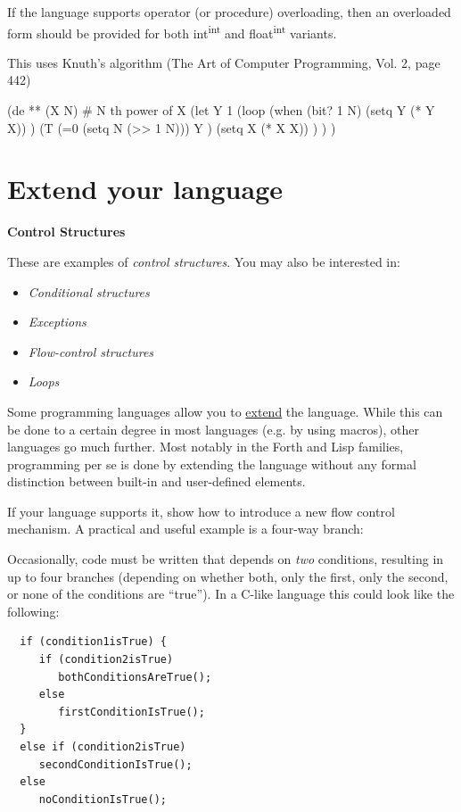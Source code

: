 If the language supports operator (or procedure) overloading, then an
overloaded form should be provided for both int\textsuperscript{int} and
float\textsuperscript{int} variants.


\begin{wideverbatim}

  This uses Knuth's algorithm (The Art of Computer Programming, Vol.
  2, page 442)

(de ** (X N)  # N th power of X
   (let Y 1
      (loop
         (when (bit? 1 N)
            (setq Y (* Y X)) )
         (T (=0 (setq N (>> 1 N)))
            Y )
         (setq X (* X X)) ) ) )

\end{wideverbatim}

\pagebreak{}
\section*{Extend your language}

\textbf{Control Structures}

These are examples of \emph{control structures}. You may also be
interested in:

\begin{itemize}
\item
 \emph{Conditional structures}
\item
  \emph{Exceptions}
\item
  \emph{Flow-control structures}
\item
  \emph{Loops}
\end{itemize}

Some programming languages allow you to
\href{http://en.wikipedia.org/wiki/Extensible\_programming}{extend}
the language. While this can be done to a certain degree in most
languages (e.g. by using macros), other languages go much further.
Most notably in the Forth and Lisp families, programming per se is
done by extending the language without any formal distinction between
built-in and user-defined elements.

If your language supports it, show how to introduce a new flow control
mechanism. A practical and useful example is a four-way branch:

Occasionally, code must be written that depends on \emph{two}
conditions, resulting in up to four branches (depending on whether both,
only the first, only the second, or none of the conditions are
``true''). In a C-like language this could look like the following:

\begin{verbatim}
  if (condition1isTrue) {
     if (condition2isTrue)
        bothConditionsAreTrue();
     else
        firstConditionIsTrue();
  }
  else if (condition2isTrue)
     secondConditionIsTrue();
  else
     noConditionIsTrue();
\end{verbatim}

